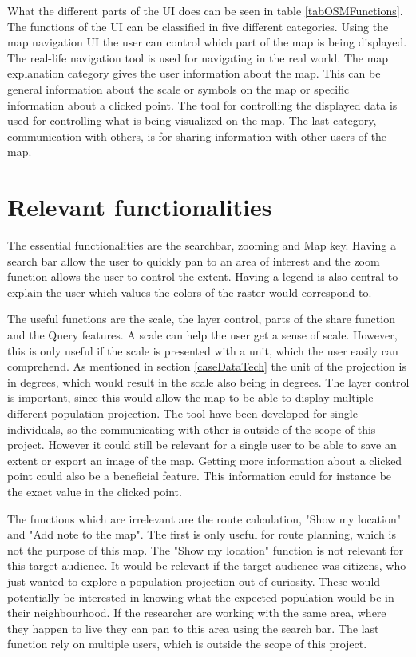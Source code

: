 What the different parts of the UI does can be seen in table \ref{tabOSMFunctions}. The functions of the UI can be classified in five different categories. Using the map navigation UI the user can control which part of the map is being displayed.
The real-life navigation tool is used for navigating in the real world. 
The map explanation category gives the user information about the map. This can be general information about the scale or symbols on the map or specific information about a clicked point. 
The tool for controlling the displayed data is used for controlling what is being visualized on the map.
The last category, communication with others, is for sharing information with other users of the map. 

\section{Relevant functionalities}\label{SortingFunctions}

The essential functionalities are the searchbar, zooming and Map key. 
Having a search bar allow the user to quickly pan to an area of interest and the zoom function allows the user to control the extent. Having a legend is also central to explain the user which values the colors of the raster would correspond to. 


The useful functions are the scale, the layer control, parts of the share function and the Query features. A scale can help the user get a sense of scale. However, this is only useful if the scale is presented with a unit, which the user easily can comprehend. As mentioned in section \ref{caseDataTech} the unit of the projection is in degrees, which would result in the scale also being in degrees. The layer control is important, since this would allow the map to be able to display multiple different population projection. The tool have been developed for single individuals, so the communicating with other is outside of the scope of this project. However it could still be relevant for a single user to be able to save an extent or export an image of the map. Getting more information about a clicked point could also be a beneficial feature. This information could for instance be the exact value in the clicked point. 

The functions which are irrelevant are the route calculation, "Show my location" and "Add note to the map". The first is only useful for route planning, which is not the purpose of this map. The "Show my location" function is not relevant for this target audience. It would be relevant if the target audience was citizens, who just wanted to explore a population projection out of curiosity. These would potentially be interested in knowing what the expected population would be in their neighbourhood. If the researcher are working with the same area, where they happen to live they can pan to this area using the search bar. The last function rely on multiple users, which is outside the scope of this project.

